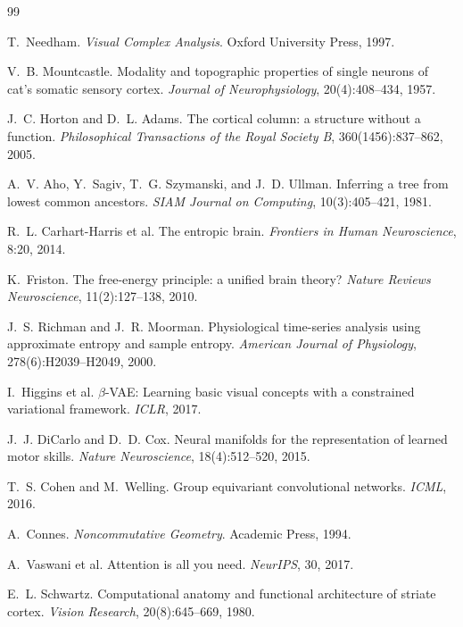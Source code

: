 \documentclass[12pt,a4paper,oneside]{book}
\numberwithin{equation}{chapter}
\theoremstyle{plain}
\theoremstyle{definition}
\theoremstyle{remark}
\begin{document}
\begin{thebibliography}{99}

T.~Needham.
\newblock \emph{Visual Complex Analysis}.
\newblock Oxford University Press, 1997.

V.~B. Mountcastle.
\newblock Modality and topographic properties of single neurons of cat's
  somatic sensory cortex.
\newblock \emph{Journal of Neurophysiology}, 20(4):408--434, 1957.

J.~C. Horton and D.~L. Adams.
\newblock The cortical column: a structure without a function.
\newblock \emph{Philosophical Transactions of the Royal Society B},
  360(1456):837--862, 2005.

A.~V. Aho, Y.~Sagiv, T.~G. Szymanski, and J.~D. Ullman.
\newblock Inferring a tree from lowest common ancestors.
\newblock \emph{SIAM Journal on Computing}, 10(3):405--421, 1981.

R.~L. Carhart-Harris et al.
\newblock The entropic brain.
\newblock \emph{Frontiers in Human Neuroscience}, 8:20, 2014.

K.~Friston.
\newblock The free-energy principle: a unified brain theory?
\newblock \emph{Nature Reviews Neuroscience}, 11(2):127--138, 2010.

J.~S. Richman and J.~R. Moorman.
\newblock Physiological time-series analysis using approximate entropy and
  sample entropy.
\newblock \emph{American Journal of Physiology}, 278(6):H2039--H2049, 2000.

I.~Higgins et al.
\newblock $\beta$-{VAE}: Learning basic visual concepts with a constrained
  variational framework.
\newblock \emph{ICLR}, 2017.

J.~J. DiCarlo and D.~D. Cox.
\newblock Neural manifolds for the representation of learned motor skills.
\newblock \emph{Nature Neuroscience}, 18(4):512--520, 2015.

T.~S. Cohen and M.~Welling.
\newblock Group equivariant convolutional networks.
\newblock \emph{ICML}, 2016.

A.~Connes.
\newblock \emph{Noncommutative Geometry}.
\newblock Academic Press, 1994.

A.~Vaswani et al.
\newblock Attention is all you need.
\newblock \emph{NeurIPS}, 30, 2017.

E.~L. Schwartz.
\newblock Computational anatomy and functional architecture of striate cortex.
\newblock \emph{Vision Research}, 20(8):645--669, 1980.


\end{thebibliography}
\end{document}
